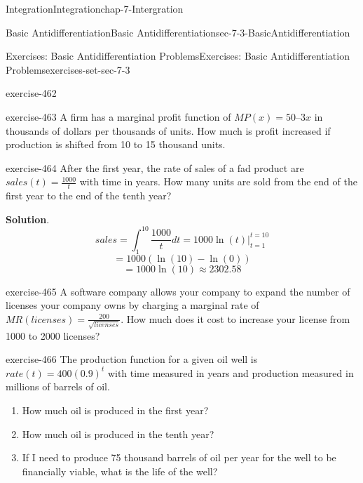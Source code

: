 \documentclass[oneside,10pt,]{book}
\numberwithin{equation}{section}
\begin{document}
\begin{chapterptx}{Integration}{}{Integration}{}{}{chap-7-Intergration}
\begin{sectionptx}{Basic Antidifferentiation}{}{Basic Antidifferentiation}{}{}{sec-7-3-BasicAntidifferentiation}
\begin{exercises-subsection-numberless}{Exercises: Basic Antidifferentiation Problems}{}{Exercises: Basic Antidifferentiation Problems}{}{}{exercises-set-sec-7-3}
\begin{divisionexercise}{17}{}{}{exercise-462}
\begin{equation*}
\end{equation*}
\end{divisionexercise}%
\begin{divisionexercise}{18}{}{}{exercise-463}%
\hypertarget{p-2806}{}%
A firm has a marginal profit function of \(MP(x) = 50 – 3 x\) in thousands of dollars per thousands of units.  How much is profit increased if production is shifted from 10 to 15 thousand units.%
\end{divisionexercise}%
\begin{divisionexercise}{19}{}{}{exercise-464}%
\hypertarget{p-2807}{}%
After the first year, the rate of sales of a fad product are \(sales(t) = \frac{1000}{t}\) with time in years.  How many units are sold from the end of the first year to the end of the tenth year?%
\par\smallskip%
\noindent\textbf{Solution}.\hypertarget{solution-235}{}\quad%
%
\begin{equation*}
sales=\int_1^{10}\frac{1000}{t} dt=1000 \ln(t) |_{t=1}^{t=10}
\end{equation*}
%
\begin{equation*}
=1000(\ln(10)-\ln(0) )
\end{equation*}
%
\begin{equation*}
=1000\ln(10)\approx 2302.58
\end{equation*}
\end{divisionexercise}%
\begin{divisionexercise}{20}{}{}{exercise-465}%
\hypertarget{p-2808}{}%
A software company allows your company to expand the number of licenses your company owns by charging a marginal rate of \(MR(licenses)=\frac{200}{\sqrt{licenses}}\).  How much does it cost to increase your license from 1000 to 2000 licenses?%
\end{divisionexercise}%
\begin{divisionexercise}{21}{}{}{exercise-466}%
\hypertarget{p-2809}{}%
The production function for a given oil well is \(rate(t) = 400(0.9)^t\) with time measured in years and production measured in millions of barrels of oil.%
\leavevmode%
\begin{enumerate}[label=(\alph*)]
\item\hypertarget{li-754}{}\hypertarget{p-2810}{}%
How much oil is produced in the first year?%
\item\hypertarget{li-755}{}\hypertarget{p-2811}{}%
How much oil is produced in the tenth year?%
\item\hypertarget{li-756}{}\hypertarget{p-2812}{}%
If I need to produce 75 thousand barrels of oil per year for the well to be financially viable, what is the life of the well?%

\end{enumerate}
\end{divisionexercise}
\end{exercises-subsection-numberless}
\end{sectionptx}
\end{chapterptx}
\end{document}
